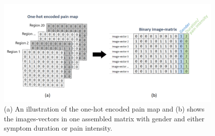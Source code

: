\begin{figure} [H]
\centering
\includegraphics[width=1\textwidth]{figures/onehotmatrix}
\caption{(a) An illustration of the one-hot encoded pain map and (b) shows the images-vectors in one assembled matrix with gender and either symptom duration or pain intensity.}
\label{fig:onehot}
\end{figure}
